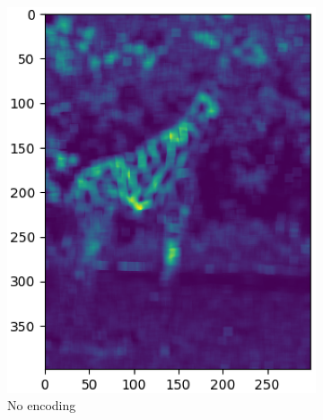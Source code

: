 \documentclass{article}
\begin{document}
\begin{figure}[!h]
  \begin{subfigure}{.2\textwidth}
    \includegraphics[width=\textwidth]{Bilder/MSE_Bilder/cropped/kernel10_scale_0.003_G.eps}
    \caption{No encoding}
    \label{MSE256Scale}
  \end{subfigure}\hfill
  \begin{subfigure}{.2\textwidth}

\end{subfigure}
\end{figure}
\end{document}
